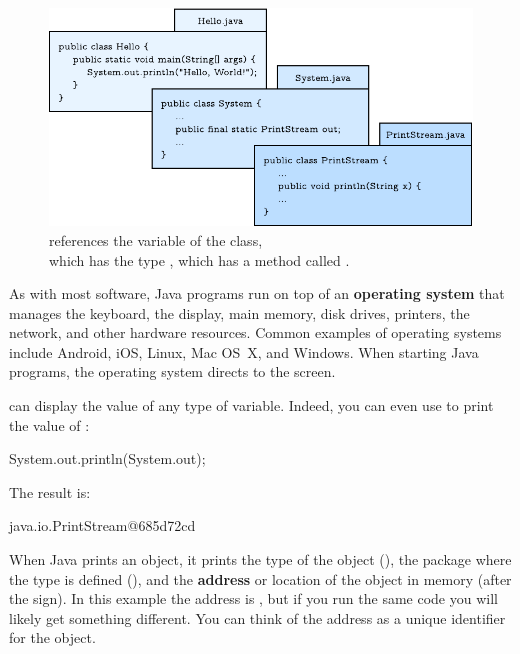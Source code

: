 \begin{figure}[!h]
\includegraphics{system.pdf}
\caption{ references the  variable of the  class,
\\ which has the type , which has a method called .}
\end{figure}


As with most software, Java programs run on top of an {\bf operating system} that manages the keyboard, the display, main memory, disk drives, printers, the network, and other hardware resources.
Common examples of operating systems include Android, iOS, Linux, Mac OS~X, and Windows.
When starting Java programs, the operating system directs  to the screen.

 can display the value of any type of variable.
Indeed, you can even use  to print the value of :

\begin{code}
System.out.println(System.out);
\end{code}

The result is:

\begin{stdout}
java.io.PrintStream@685d72cd
\end{stdout}


When Java prints an object, it prints the type of the object (), the package where the type is defined (), and the {\bf address} or location of the object in memory (after the  sign).
In this example the address is , but if you run the same code you will likely get something different.
You can think of the address as a unique identifier for the object.

